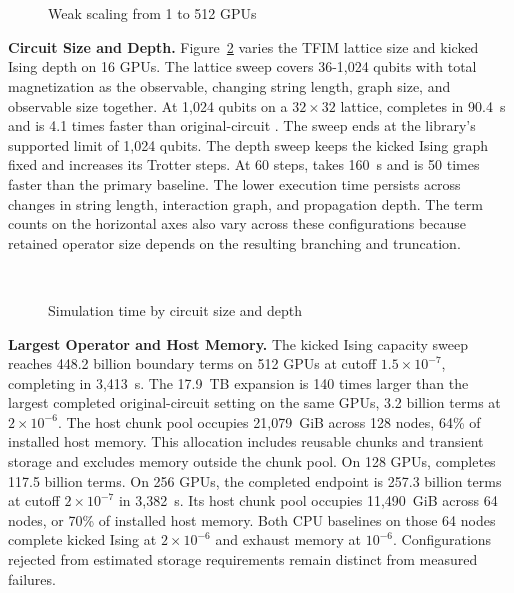 \begin{figure}[t]
\centering
{}\\[-2pt]
\hfill
{}\hfill
{}\\
\hfill
{}\hfill
{}
\caption{Weak scaling from 1 to 512 GPUs}
\label{fig:weak}
\end{figure}

\noindent\textbf{Circuit Size and Depth.}
Figure~\ref{fig:size} varies the TFIM lattice size and kicked Ising depth on 16 GPUs.
The lattice sweep covers 36-1,024 qubits with total magnetization as the observable, changing string length, graph size, and observable size together.
At 1,024 qubits on a $32\times32$ lattice, \SectorQ completes in 90.4~s and is 4.1 times faster than original-circuit \cuPP.
The sweep ends at the library's supported limit of 1,024 qubits.
The depth sweep keeps the kicked Ising graph fixed and increases its Trotter steps.
At 60 steps, \SectorQ takes 160~s and is 50 times faster than the primary baseline.
The lower execution time persists across changes in string length, interaction graph, and propagation depth.
The term counts on the horizontal axes also vary across these configurations because retained operator size depends on the resulting branching and truncation.

\begin{figure}[t]
\centering
{}\\[-2pt]
\hfill
{}\hfill
{}
\caption{Simulation time by circuit size and depth}
\label{fig:size}
\end{figure}

\noindent\textbf{Largest Operator and Host Memory.}
The kicked Ising capacity sweep reaches 448.2 billion boundary terms on 512 GPUs at cutoff $1.5\times10^{-7}$, completing in 3,413~s.
The 17.9~TB expansion is 140 times larger than the largest completed original-circuit \cuPP setting on the same GPUs, 3.2 billion terms at $2\times10^{-6}$.
The host chunk pool occupies 21,079~GiB across 128 nodes, 64\% of installed host memory.
This allocation includes reusable chunks and transient storage and excludes memory outside the chunk pool.
On 128 GPUs, \SectorQ completes 117.5 billion terms.
On 256 GPUs, the completed endpoint is 257.3 billion terms at cutoff $2\times10^{-7}$ in 3,382~s.
Its host chunk pool occupies 11,490~GiB across 64 nodes, or 70\% of installed host memory.
Both CPU baselines on those 64 nodes complete kicked Ising at $2\times10^{-6}$ and exhaust memory at $10^{-6}$.
Configurations rejected from estimated storage requirements remain distinct from measured failures.

